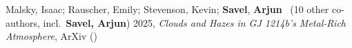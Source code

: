 \item[{\color{numcolor}\scriptsize1}] Malsky, Isaac; Rauscher, Emily; Stevenson, Kevin; \textbf{Savel}, \textbf{Arjun} \etal\ ({10} other co-authors, incl.\ \textbf{Savel, Arjun}) 2025, \emph{Clouds and Hazes in GJ 1214b's Metal-Rich Atmosphere}, ArXiv ()